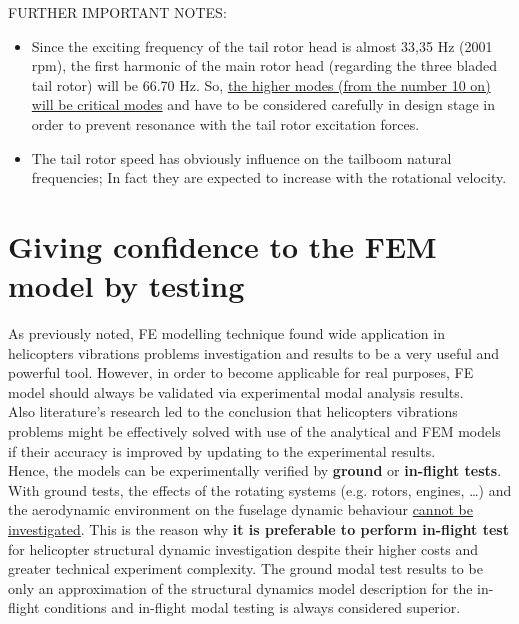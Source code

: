 \smallskip
\noindent
FURTHER IMPORTANT NOTES:
\noindent
\begin{itemize}
	\item Since the exciting frequency of the tail rotor head is almost 33,35 Hz (2001 rpm), the first harmonic of the main rotor head (regarding the three bladed tail rotor) will be 66.70 Hz. So, \underline{the higher modes (from the number 10 on) will be critical modes} and have to be considered carefully in design stage in order to prevent
	resonance with the tail rotor excitation forces. 
	
	\item \noindent
	The tail rotor speed has obviously influence on the tailboom natural frequencies; In fact they are expected to increase with the rotational velocity.\\
\end{itemize}


\medskip
\section*{Giving confidence to the FEM model by testing}
\noindent   
As previously noted, FE modelling technique found wide application in helicopters vibrations problems investigation and results to be a very useful and powerful tool. However, in order to become applicable for real purposes, FE model should always be validated via experimental modal analysis results. \\
\noindent
Also literature's research led to the conclusion that helicopters vibrations problems might be effectively solved with use of the analytical and FEM models if their accuracy is improved by updating to the experimental results. \\

\noindent
Hence, the models can be experimentally verified by \textbf{ground} or \textbf{in-flight tests}.\\
\noindent
With ground tests, the effects of the rotating systems (e.g. rotors, engines, \dots) and the aerodynamic environment on the fuselage dynamic behaviour \underline{cannot be investigated}. This is the reason why \textbf{it is preferable to perform in-flight test} for helicopter structural dynamic investigation despite their higher costs and greater technical experiment complexity.
The ground modal test results to be only an approximation of the structural dynamics model description
for the in-flight conditions and in-flight modal testing is always considered superior.
%
